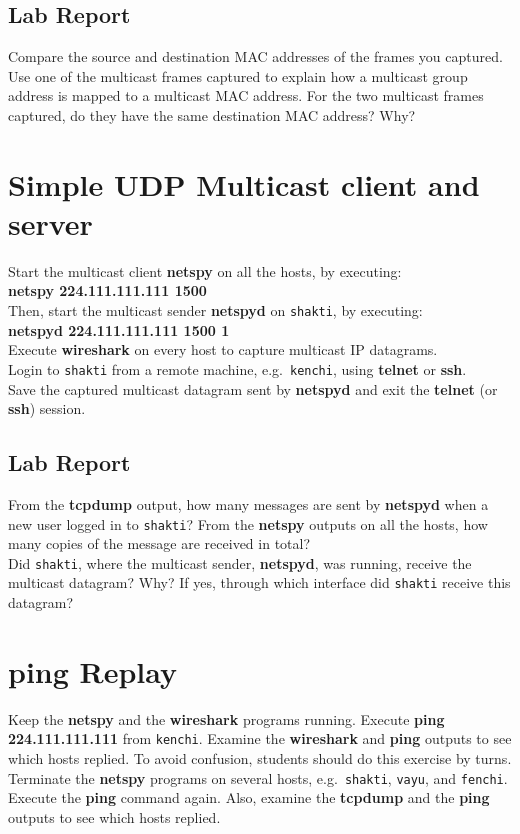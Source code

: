 \documentclass[10pt,a4paper]{article}
\numberwithin{equation}{section}
\numberwithin{figure}{section}
\numberwithin{table}{section}
\begin{document}
    \subsection*{Lab Report}
    Compare the source and destination MAC addresses of the frames you captured. \\
    Use one of the multicast frames captured to explain how a multicast group address is mapped to a multicast MAC address.
    For the two multicast frames captured, do they have the same destination MAC address?
    Why?

    \section{Simple UDP Multicast client and server}
    Start the multicast client \textbf{netspy} on all the hosts, by executing: \\
    \textbf{netspy 224.111.111.111 1500} \\
    Then, start the multicast sender \textbf{netspyd} on \texttt{shakti}, by executing: \\
    \textbf{netspyd 224.111.111.111 1500 1} \\
    Execute \textbf{wireshark} on every host to capture multicast IP datagrams. \\
    Login to \texttt{shakti} from a remote machine, e.g.\  \texttt{kenchi}, using \textbf{telnet} or \textbf{ssh}. \\
    Save the captured multicast datagram sent by \textbf{netspyd} and exit the \textbf{telnet} (or \textbf{ssh}) session.

    \subsection*{Lab Report}
    From the \textbf{tcpdump} output, how many messages are sent by \textbf{netspyd} when a new user logged in to \texttt{shakti}?
    From the \textbf{netspy} outputs on all the hosts, how many copies of the message are received in total? \\
    Did \texttt{shakti}, where the multicast sender, \textbf{netspyd}, was running, receive the multicast datagram?
    Why?
    If yes, through which interface did \texttt{shakti} receive this datagram?

    \section{ping Replay}
    Keep the \textbf{netspy} and the \textbf{wireshark} programs running.
    Execute \textbf{ping 224.111.111.111} from \texttt{kenchi}.
    Examine the \textbf{wireshark} and \textbf{ping} outputs to see which hosts replied.
    To avoid confusion, students should do this exercise by turns.
    Terminate the \textbf{netspy} programs on several hosts, e.g.\  \texttt{shakti}, \texttt{vayu}, and \texttt{fenchi}.
    Execute the \textbf{ping} command again.
    Also, examine the \textbf{tcpdump} and the \textbf{ping} outputs to see which hosts replied.
\end{document}
